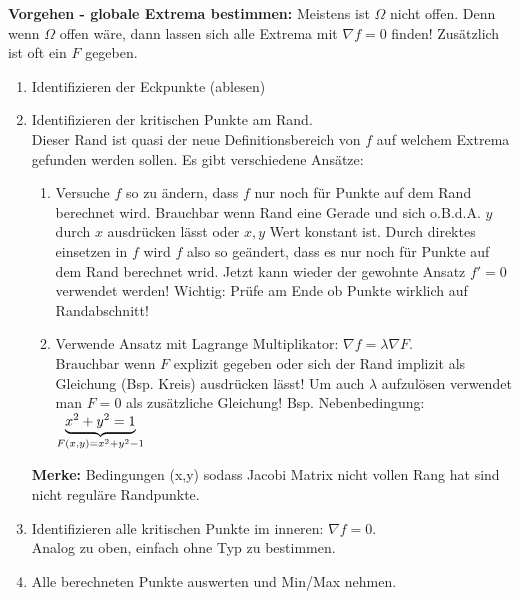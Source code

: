 \textbf{Vorgehen - globale Extrema bestimmen:} 
Meistens ist $\Omega$ nicht offen. Denn wenn $\Omega$ offen wäre, dann lassen sich alle Extrema mit $\nabla f = 0$ finden! Zusätzlich ist oft ein $F$ gegeben.
\begin{footnotesize}
\begin{enumerate}[leftmargin=0.5cm]
	\item Identifizieren der Eckpunkte (ablesen)

	\item Identifizieren der kritischen Punkte am Rand. \\
	Dieser Rand ist quasi der neue Definitionsbereich von $f$ auf welchem Extrema gefunden werden sollen.
	Es gibt verschiedene Ansätze:
	\begin{enumerate}[leftmargin=0.3cm]
		\item Versuche $f$ so zu ändern, dass $f$ nur noch für Punkte auf dem Rand berechnet wird. Brauchbar wenn Rand eine Gerade und sich o.B.d.A. $y$ durch $x$ ausdrücken lässt oder $x, y$ Wert konstant ist. Durch direktes einsetzen in $f$ wird $f$ also so geändert, dass es nur noch für Punkte auf dem Rand berechnet wrid. Jetzt kann wieder der gewohnte Ansatz $f' = 0$ verwendet werden! Wichtig: Prüfe am Ende ob Punkte wirklich auf Randabschnitt!

		\item Verwende Ansatz mit Lagrange Multiplikator: $\nabla f = \lambda \nabla F$.\\
		Brauchbar wenn $F$ explizit gegeben oder sich der Rand implizit als Gleichung (Bsp. Kreis) ausdrücken lässt! Um auch $\lambda$ aufzulösen verwendet man $F = 0$ als zusätzliche Gleichung! 
		Bsp. Nebenbedingung: $\underset{F(x,y) = x^2 + y^2 - 1}{\underbrace{x^2 + y^2 = 1}}$
 	\end{enumerate}
 	\textbf{Merke:} Bedingungen (x,y) sodass Jacobi Matrix nicht vollen Rang hat sind nicht reguläre Randpunkte.  

 	\item Identifizieren alle kritischen Punkte im inneren: $\nabla f = 0$. \\
	Analog zu oben, einfach ohne Typ zu bestimmen.

	\item Alle berechneten Punkte auswerten und Min/Max nehmen.
\end{enumerate}
\end{footnotesize}
